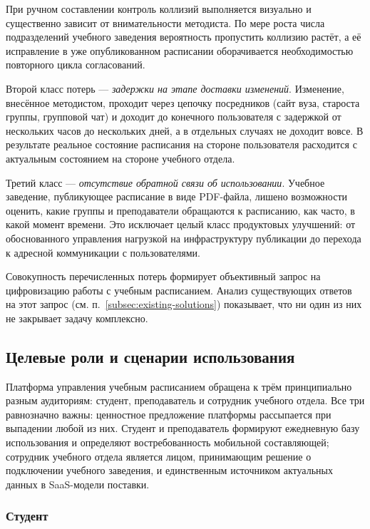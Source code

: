 При ручном составлении контроль коллизий выполняется визуально и существенно зависит от внимательности методиста. По мере роста числа подразделений учебного заведения вероятность пропустить коллизию растёт, а её исправление в уже опубликованном расписании оборачивается необходимостью повторного цикла согласований.

Второй класс потерь --- \emph{задержки на этапе доставки изменений}. Изменение, внесённое методистом, проходит через цепочку посредников (сайт вуза, староста группы, групповой чат) и доходит до конечного пользователя с задержкой от нескольких часов до нескольких дней, а в отдельных случаях не доходит вовсе. В результате реальное состояние расписания на стороне пользователя расходится с актуальным состоянием на стороне учебного отдела.

Третий класс --- \emph{отсутствие обратной связи об использовании}. Учебное заведение, публикующее расписание в виде PDF-файла, лишено возможности оценить, какие группы и преподаватели обращаются к расписанию, как часто, в какой момент времени. Это исключает целый класс продуктовых улучшений: от обоснованного управления нагрузкой на инфраструктуру публикации до перехода к адресной коммуникации с пользователями.

Совокупность перечисленных потерь формирует объективный запрос на цифровизацию работы с учебным расписанием. Анализ существующих ответов на этот запрос (см. п.~\ref{subsec:existing-solutions}) показывает, что ни один из них не закрывает задачу комплексно.

\subsection{Целевые роли и сценарии использования}
\label{subsec:roles}

Платформа управления учебным расписанием обращена к трём принципиально разным аудиториям: студент, преподаватель и сотрудник учебного отдела. Все три равнозначно важны: ценностное предложение платформы рассыпается при выпадении любой из них. Студент и преподаватель формируют ежедневную базу использования и определяют востребованность мобильной составляющей; сотрудник учебного отдела является лицом, принимающим решение о подключении учебного заведения, и единственным источником актуальных данных в SaaS-модели поставки.

\subsubsection{Студент}

